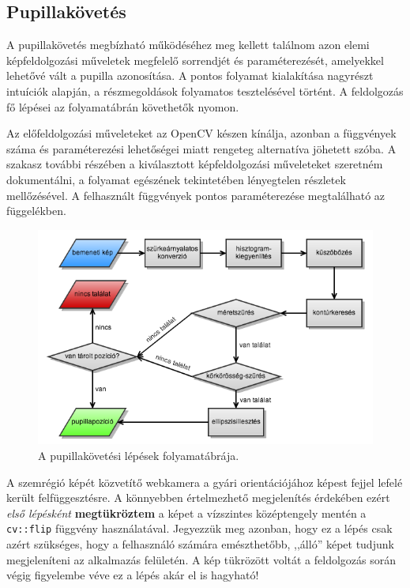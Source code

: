 \subsection{Pupillakövetés}\label{sect:pupillakov}

A pupillakövetés megbízható működéséhez meg kellett találnom azon elemi képfeldolgozási műveletek megfelelő sorrendjét és paraméterezését, amelyekkel lehetővé vált a pupilla azonosítása. A pontos folyamat kialakítása nagyrészt intuíciók alapján, a részmegoldások folyamatos tesztelésével történt. A feldolgozás fő lépései az  folyamatábrán követhetők nyomon.

Az előfeldolgozási műveleteket az OpenCV készen kínálja, azonban a függvények száma és paraméterezési lehetőségei miatt rengeteg alternatíva jöhetett szóba. A szakasz további részében a kiválasztott képfeldolgozási műveleteket szeretném dokumentálni, a folyamat egészének tekintetében lényegtelen részletek mellőzésével. A felhasznált függvények pontos paraméterezése megtalálható az  függelékben. 

\begin{figure}[!ht]
\centering
\includegraphics[width=140mm, keepaspectratio]{figures/folyamat.png}
\caption{A pupillakövetési lépések folyamatábrája.}
\label{fig:folyamat}
\end{figure}

A szemrégió képét közvetítő webkamera a gyári orientációjához képest fejjel lefelé került felfüggesztésre. A könnyebben értelmezhető megjelenítés érdekében ezért \emph{első lépésként} \textbf{megtükröztem} a képet a vízszintes középtengely mentén a \texttt{cv::flip} függvény használatával. Jegyezzük meg azonban, hogy ez a lépés csak azért szükséges, hogy a felhasználó számára emészthetőbb, ,,álló'' képet tudjunk megjeleníteni az alkalmazás felületén. A kép tükrözött voltát a feldolgozás során végig figyelembe véve ez a lépés akár el is hagyható!

